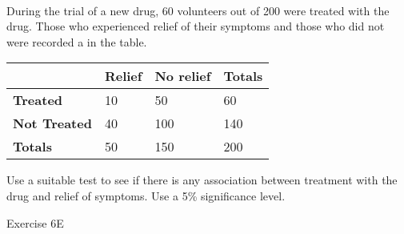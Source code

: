 \documentclass[fleqn]{article}
\begin{document}
\begin{examplebox}{}{}
    \\ %
    During the trial of a new drug, 60 volunteers out of 200 were treated with the drug. Those who experienced relief of their symptoms and those who did not were recorded a in the table.
    
    \begin{center}
    \begin{minipage}[t]{0.6\linewidth}
        \begin{tabularx}{\textwidth}{|X|*3{P{20mm}|}}
             & \textbf{Relief} & \textbf{No relief} & \textbf{Totals}   \\\hline
            \textbf{Treated}      & 10              & 50                 & 60                \\\hline
            \textbf{Not Treated}  & 40              & 100                & 140               \\\hline
            \textbf{Totals}       & 50              & 150                & 200               \\\hline
        \end{tabularx}
        \vspace{4mm}
    \end{minipage}
    \end{center}
    
    Use a suitable test to see if there is any association between treatment with the drug and relief of symptoms. Use a 5\% significance level.
\end{examplebox}
\vfill
\begin{practice*}{Exercise 6E}{}
\end{practice*}
\newpage
\end{document}
